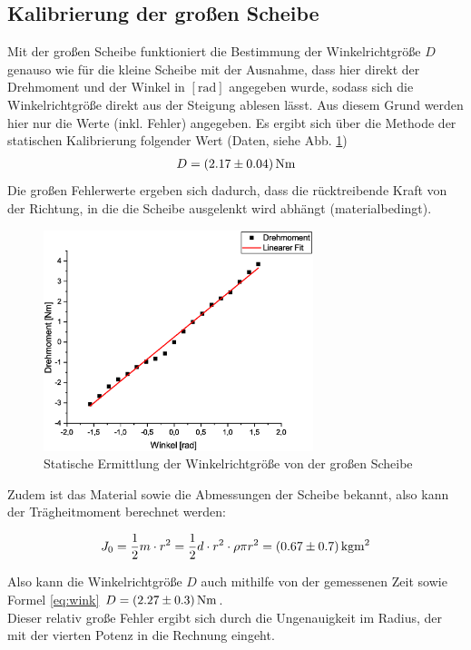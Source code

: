 \subsection{Kalibrierung der großen Scheibe}
Mit der großen Scheibe funktioniert die Bestimmung der Winkelrichtgröße $D$ genauso wie für die kleine Scheibe mit der Ausnahme, dass hier direkt der Drehmoment und der Winkel in $[\mathrm{rad}]$ angegeben wurde, sodass sich die Winkelrichtgröße direkt aus der Steigung ablesen lässt. Aus diesem Grund werden hier nur die Werte (inkl. Fehler) angegeben. Es ergibt sich über die Methode der statischen Kalibrierung folgender Wert (Daten, siehe Abb. \ref{fig:kal3})
\begin{align*}
D = \unit[(2.17 \pm 0.04)]{N m}
\end{align*}
Die großen Fehlerwerte ergeben sich dadurch, dass die rücktreibende Kraft von der Richtung, in die die Scheibe ausgelenkt wird abhängt (materialbedingt).

\begin{figure}
\begin{center}
\includegraphics[width=0.7\textwidth]{Bilder/kal3.eps}
\caption{Statische Ermittlung der Winkelrichtgröße von der großen Scheibe}
\label{fig:kal3}
\end{center}
\end{figure}

Zudem ist das Material sowie die Abmessungen der Scheibe bekannt, also kann der Trägheitmoment berechnet werden:

\begin{equation}
J_0 = \frac{1}{2} m \cdot r^2 = \frac{1}{2} d\cdot r^2 \cdot \rho \pi r^2 = \unit[(0.67 \pm 0.7)]{kg m^2}
\end{equation}

Also kann die Winkelrichtgröße $D$ auch mithilfe von der gemessenen Zeit sowie Formel \ref{eq:wink} $D = \unit[(2.27 \pm 0.3)]{N m}$.\\
Dieser relativ große Fehler ergibt sich durch die Ungenauigkeit im Radius, der mit der vierten Potenz in die Rechnung eingeht.






